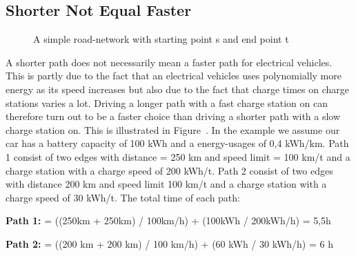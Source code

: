 \subsection{Shorter Not Equal Faster}

\begin{figure}

\label{figure:simpleroad-network}
\caption{A simple road-network with starting point s and end point t}
\end{figure}
A shorter path does not necessarily mean a faster path for electrical vehicles. 
This is partly due to the fact that an electrical vehicles uses polynomially more energy as its speed increases but also due to the fact that charge times on charge stations
varies a lot. Driving a longer path with a fast charge station on can therefore turn out to
be a faster choice than driving a shorter path with a slow charge station on. This is illustrated 
in Figure~. In the example we assume our car has a battery capacity of 100 kWh and a energy-usages of
0,4 kWh/km. Path 1 consist of two edges with distance = 250 km and speed limit = 100 km/t
and a charge station with a charge speed of 200 kWh/t. Path 2 consist of two edges with
distance 200 km and speed limit 100 km/t and a charge station with a charge speed of 30 kWh/t.
The total time of each path:
				
\textbf{Path 1:}  = ((250km + 250km) / 100km/h) + (100kWh / 200kWh/h) = 5,5h
				
\textbf{Path 2:}  = ((200 km + 200 km) / 100 km/h) + (60 kWh / 30 kWh/h) = 6 h